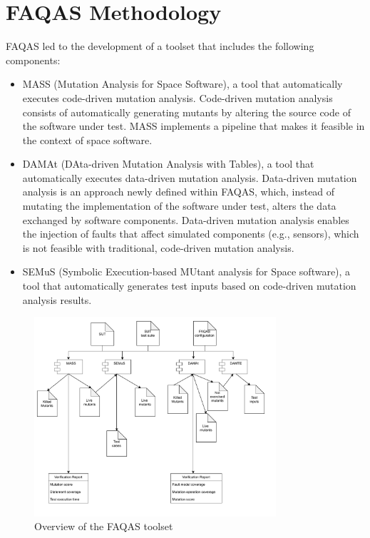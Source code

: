 
\chapter{FAQAS Methodology}
\label{chapter:methodology}

FAQAS led to the development of a toolset that includes the following components:
\begin{itemize}
\item MASS (Mutation Analysis for Space Software), a tool that automatically executes code-driven mutation analysis. Code-driven mutation analysis consists of automatically generating mutants by altering the source code of the software under test. MASS implements a pipeline that makes it feasible in the context of space software. 
\item DAMAt (DAta-driven Mutation Analysis with Tables), a tool that automatically executes data-driven mutation analysis. Data-driven mutation analysis is an approach newly defined within FAQAS, which, instead of mutating the implementation of the software under test, alters the data exchanged by software components. Data-driven mutation analysis enables the injection of faults that affect simulated components (e.g., sensors), which is not feasible with traditional, code-driven mutation analysis.
\item SEMuS (Symbolic Execution-based MUtant analysis for Space software), a tool that automatically generates test inputs based on code-driven mutation analysis results. 
\end{itemize}

\begin{figure}[tb]
\begin{center}
\includegraphics[width=0.8\textwidth]{images/FAQAS.drawio.pdf}
\caption{Overview of the FAQAS toolset}
\label{fig:FAQAS:toolset}
\end{center}
\end{figure}

